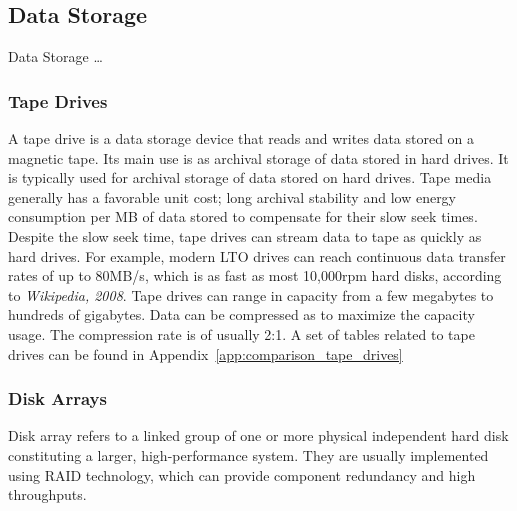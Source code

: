         \subsection{Data Storage} \label{sec2:data_storage}
            Data Storage \ldots
            
            \subsubsection*{Tape Drives}
                A tape drive is a data storage device that reads and writes data stored on a magnetic tape. Its main use is as archival storage of data stored in hard drives. It is typically used for archival storage of data stored on hard drives. 
Tape media generally has a favorable unit cost; long archival stability and low energy consumption per MB of data stored to compensate for their slow seek times. Despite the slow seek time, tape drives can stream data to tape as quickly as hard drives. For example, modern LTO drives can reach continuous data transfer rates of up to 80MB/s, which is as fast as most 10,000rpm hard disks, according to \emph{Wikipedia, 2008}. Tape drives can range in capacity from a few megabytes to hundreds of gigabytes. Data can be compressed as to maximize the capacity usage. The compression rate is of usually 2:1. A set of tables related to tape drives can be found in Appendix~\ref{app:comparison_tape_drives}
            
            \subsubsection*{Disk Arrays}
                Disk array refers to a linked group of one or more physical independent hard disk constituting a larger, high-performance system. They are usually implemented using RAID technology, which can provide component redundancy and high throughputs.
        
